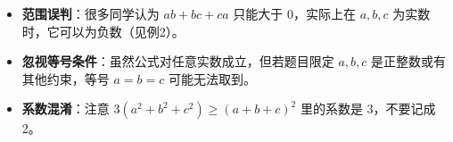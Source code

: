 \begin{trapbox}
\begin{itemize}
    \item \textbf{范围误判}：很多同学认为 $ab+bc+ca$ 只能大于 0，实际上在 $a,b,c$ 为实数时，它可以为负数（见例2）。
    \item \textbf{忽视等号条件}：虽然公式对任意实数成立，但若题目限定 $a,b,c$ 是正整数或有其他约束，等号 $a=b=c$ 可能无法取到。
    \item \textbf{系数混淆}：注意 $3(a^2+b^2+c^2) \geqslant (a+b+c)^2$ 里的系数是 3，不要记成 2。
\end{itemize}
\end{trapbox}